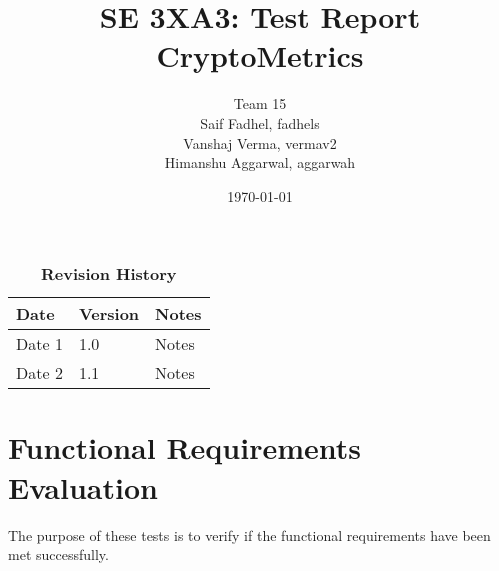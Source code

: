 \documentclass[12pt, titlepage]{article}
\title{SE 3XA3: Test Report\\CryptoMetrics}
\author{Team 15
		\\ Saif Fadhel, fadhels
		\\ Vanshaj Verma, vermav2
		\\ Himanshu Aggarwal, aggarwah
}
\date{\today}
\begin{document}
\maketitle

\tableofcontents
\listoftables
\listoffigures

\begin{table}[bp]
\caption{\bf Revision History}
\begin{tabularx}{\textwidth}{p{3cm}p{2cm}X}
\toprule {\bf Date} & {\bf Version} & {\bf Notes}\\
\midrule
Date 1 & 1.0 & Notes\\
Date 2 & 1.1 & Notes\\
\bottomrule
\end{tabularx}
\end{table}

\newpage


\section{Functional Requirements Evaluation}
The purpose of these tests is to verify if the functional requirements have been met successfully.
\end{document}
